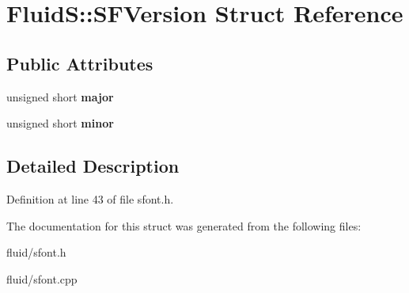 \hypertarget{struct_fluid_s_1_1_s_f_version}{}\section{FluidS\+:\+:S\+F\+Version Struct Reference}
\label{struct_fluid_s_1_1_s_f_version}
\subsection*{Public Attributes}
\begin{DoxyCompactItemize}
\item 
\mbox{\label{struct_fluid_s_1_1_s_f_version_a5cd2b66e42dba426abc478986878f21e}} 
unsigned short {\bfseries major}
\item 
\mbox{\label{struct_fluid_s_1_1_s_f_version_a8100e0fb2fc7b7507be74fecbbdd3197}} 
unsigned short {\bfseries minor}
\end{DoxyCompactItemize}


\subsection{Detailed Description}


Definition at line 43 of file sfont.\+h.



The documentation for this struct was generated from the following files\+:\begin{DoxyCompactItemize}
\item 
fluid/sfont.\+h\item 
fluid/sfont.\+cpp\end{DoxyCompactItemize}
